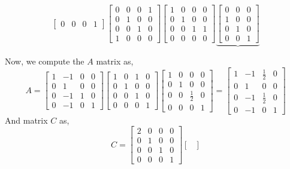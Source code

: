 \documentclass[letterpaper,10pt]{article}
\begin{document}
\begin{enumerate}
\begin{enumerate}
\[\begin{bmatrix}
0 & 0 & 0 & 1
\end{bmatrix} \begin{bmatrix}
0 & 0 & 0 & 1\\
0 & 1 & 0 & 0\\
0 & 0 & 1 & 0\\
1 & 0 & 0 & 0
\end{bmatrix} \begin{bmatrix}
1 & 0 & 0 & 0\\
0 & 1 & 0 & 0\\
0 & 0 & 1 & 1\\
0 & 0 & 0 & 0
\end{bmatrix}\underbrace{\begin{bmatrix}
0 & 0 & 0\\
1 & 0 & 0\\
0 & 1 & 0\\
0 & 0 & 1
\end{bmatrix}}\]
\end{enumerate}
Now, we compute the $A$ matrix as,
\[A=\begin{bmatrix}
1 & -1 & 0 & 0\\
0 & 1 & 0 & 0\\
0 & -1 & 1 & 0\\
0 & -1 & 0 & 1
\end{bmatrix} \begin{bmatrix}
1 & 0 & 1 & 0\\
0 & 1 & 0 & 0\\
0 & 0 & 1 & 0\\
0 & 0 & 0 & 1
\end{bmatrix} \begin{bmatrix}
1 & 0 & 0 & 0\\
0 & 1 & 0 & 0\\
0 & 0 & \frac{1}{2} & 0\\
0 & 0 & 0 & 1
\end{bmatrix}=\begin{bmatrix}
1 & -1 & \frac{1}{2} & 0\\
0 & 1 & 0 & 0\\
0 & -1 & \frac{1}{2} & 0\\
0 & -1 & 0 & 1
\end{bmatrix} \]
And matrix $C$ as,
\[C=\begin{bmatrix}
2 & 0 & 0 & 0\\
0 & 1 & 0 & 0\\
0 & 0 & 1 & 0\\
0 & 0 & 0 & 1
\end{bmatrix} \begin{bmatrix}

\end{bmatrix}\]
\end{enumerate}
\end{document}

